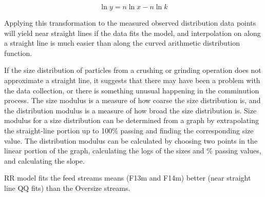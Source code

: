 \documentclass[
]{article}
\begin{document}
\[\ln y = n \ln x - n \ln k\]

Applying this transformation to the measured observed distribution data
points will yield near straight lines if the data fits the model, and
interpolation on along a straight line is much easier than along the
curved arithmetic distribution function.

If the size distribution of particles from a crushing or grinding
operation does not approximate a straight line, it suggests that there
may have been a problem with the data collection, or there is something
unusual happening in the comminution process. The size modulus is a
measure of how coarse the size distribution is, and the distribution
modulus is a measure of how broad the size distribution is. Size modulus
for a size distribution can be determined from a graph by extrapolating
the straight-line portion up to 100\% passing and finding the
corresponding size value. The distribution modulus can be calculated by
choosing two points in the linear portion of the graph, calculating the
logs of the sizes and \% passing values, and calculating the slope.

RR model fits the feed streams means (F13m and F14m) better (near
straight line QQ fits) than the Oversize streams.
\end{document}
